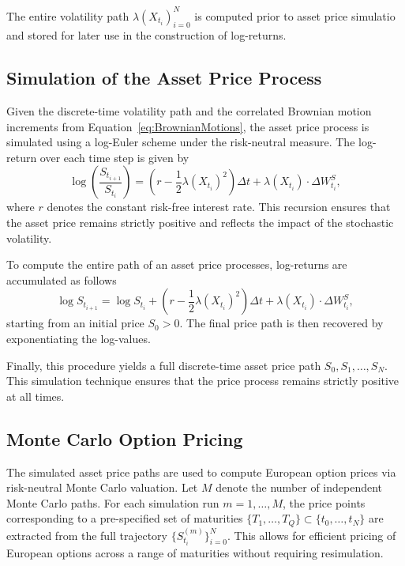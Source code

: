 The entire volatility path ${\lambda(X_{t_i})}_{i=0}^N$ is computed prior to asset price simulatio and stored for later use in the construction of log-returns.


\subsection{Simulation of the Asset Price Process} \label{subsec:SimulationAssetPriceProcess}

Given the discrete-time volatility path and the correlated Brownian motion increments from Equation~\eqref{eq:BrownianMotions}, the asset price process is simulated using a log-Euler scheme under the risk-neutral measure. The log-return over each time step is given by
\begin{equation} \label{eq:TimeDiscrLogReturn}
    \log\left( \frac{S_{t_{i+1}}}{S_{t_i}} \right) = \left( r - \frac{1}{2} \lambda(X_{t_i})^2 \right) \Delta t + \lambda(X_{t_i}) \cdot \Delta W_{t_i}^S,
\end{equation}
where $r$ denotes the constant risk-free interest rate. This recursion ensures that the asset price remains strictly positive and reflects the impact of the stochastic volatility.

To compute the entire path of an asset price processes, log-returns are accumulated as follows
\begin{equation} \label{eq:TimeDiscrLogPrice}
    \log S_{t_{i+1}} = \log S_{t_i} + \left( r - \frac{1}{2} \lambda(X_{t_i})^2 \right) \Delta t + \lambda(X_{t_i}) \cdot \Delta W_{t_i}^S,
\end{equation}
starting from an initial price $S_0 > 0$. The final price path is then recovered by exponentiating the log-values.

Finally, this procedure yields a full discrete-time asset price path $S_0, S_1, \ldots, S_N$. This simulation technique ensures that the price process remains strictly positive at all times.


\subsection{Monte Carlo Option Pricing} \label{subsec:MonteCarloOptionPricing}

The simulated asset price paths are used to compute European option prices via risk-neutral Monte Carlo valuation. Let $M$ denote the number of independent Monte Carlo paths. For each simulation run $m = 1, \ldots, M$, the price points corresponding to a pre-specified set of maturities $\{T_1,\ldots,T_Q\} \subset \{t_0,\ldots,t_N\}$ are extracted from the full trajectory $\{S_{t_i}^{(m)}\}_{i=0}^N$. This allows for efficient pricing of European options across a range of maturities without requiring resimulation.


